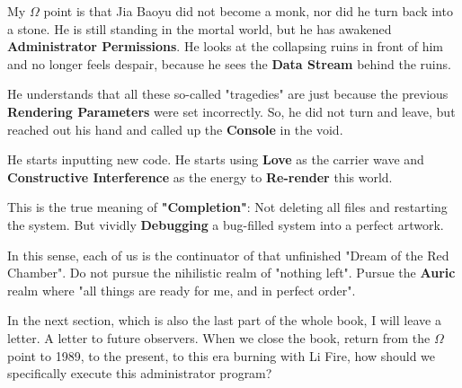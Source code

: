 My $\Omega$ point is that Jia Baoyu did not become a monk, nor did he turn back into a stone.
He is still standing in the mortal world, but he has awakened \textbf{Administrator Permissions}.
He looks at the collapsing ruins in front of him and no longer feels despair, because he sees the \textbf{Data Stream} behind the ruins.

He understands that all these so-called "tragedies" are just because the previous \textbf{Rendering Parameters} were set incorrectly.
So, he did not turn and leave, but reached out his hand and called up the \textbf{Console} in the void.

He starts inputting new code.
He starts using \textbf{Love} as the carrier wave and \textbf{Constructive Interference} as the energy to \textbf{Re-render} this world.

This is the true meaning of \textbf{"Completion"}:
Not deleting all files and restarting the system.
But vividly \textbf{Debugging} a bug-filled system into a perfect artwork.

In this sense, each of us is the continuator of that unfinished "Dream of the Red Chamber".
Do not pursue the nihilistic realm of "nothing left".
Pursue the \textbf{Auric} realm where "all things are ready for me, and in perfect order".

In the next section, which is also the last part of the whole book, I will leave a letter. A letter to future observers. When we close the book, return from the $\Omega$ point to 1989, to the present, to this era burning with Li Fire, how should we specifically execute this administrator program?

